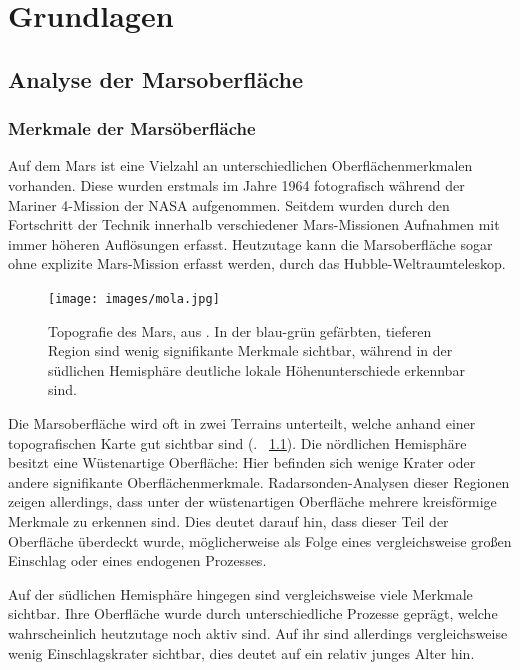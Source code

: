 \chapter{Grundlagen}
\label{chap:basics}

\section{Analyse der Marsoberfläche}
\label{sec:mars_analysis}

\subsection{Merkmale der Marsöberfläche}
\label{ssec:mars_surface}
Auf dem Mars ist eine Vielzahl an unterschiedlichen Oberflächenmerkmalen vorhanden. Diese wurden erstmals im Jahre 1964 fotografisch während der Mariner 4-Mission der NASA aufgenommen. \cite{mariner4} Seitdem wurden durch den Fortschritt der Technik innerhalb verschiedener Mars-Missionen Aufnahmen mit immer höheren Auflösungen erfasst. Heutzutage kann die Marsoberfläche sogar ohne explizite Mars-Mission erfasst werden, \zB durch das Hubble-Weltraumteleskop.

\begin{figure}
	\centering
	\texttt{[image: images/mola.jpg]}
	\captionsetup{format=plain}
	\caption{Topografie des Mars, aus \cite{mola}. In der blau-grün gefärbten, tieferen Region sind wenig signifikante Merkmale sichtbar, während in der südlichen Hemisphäre deutliche lokale Höhenunterschiede erkennbar sind.}
	\label{fig:mola}
\end{figure}

Die Marsoberfläche wird oft in zwei Terrains unterteilt, welche anhand einer topografischen Karte gut sichtbar sind (\vgl. \figurename~\ref{fig:mola}). Die nördlichen Hemisphäre besitzt eine Wüstenartige Oberfläche: Hier befinden sich wenige Krater oder andere signifikante Oberflächenmerkmale. Radarsonden-Analysen dieser Regionen zeigen allerdings, dass unter der wüstenartigen Oberfläche mehrere kreisförmige Merkmale zu erkennen sind. Dies deutet darauf hin, dass dieser Teil der Oberfläche überdeckt wurde, möglicherweise als Folge eines vergleichsweise großen Einschlag oder eines endogenen Prozesses. \cite[Kap.~7]{greeley_13}

Auf der südlichen Hemisphäre hingegen sind vergleichsweise viele Merkmale sichtbar. Ihre Oberfläche wurde durch unterschiedliche Prozesse geprägt, welche wahrscheinlich heutzutage noch aktiv sind. Auf ihr sind allerdings vergleichsweise wenig Einschlagskrater sichtbar, dies deutet auf ein relativ junges Alter hin. \cite[Kap.~7]{greeley_13}

